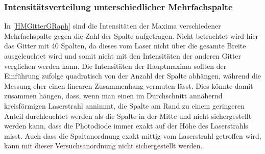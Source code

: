 \documentclass[
	a4paper,
	12pt,
	pagesize,
	ngerman
]{scrartcl}
\begin{document}
	\subsubsection{Intensitätsverteilung unterschiedlicher Mehrfachspalte}
	In \cref{HMGitterGRaph} sind die Intensitäten der Maxima verschiedener Mehrfachspalte gegen die Zahl der Spalte aufgetragen.
	Nicht betrachtet wird hier das Gitter mit 40 Spalten, da dieses vom Laser nicht über die gesamte Breite ausgeleuchtet wird und somit nicht mit den Intensitäten der anderen Gitter verglichen werden kann.
	Die Intensitäten der Hauptmaxima sollten der Einführung zufolge quadratisch von der Anzahl der Spalte abhängen, während die Messung eher einen linearen Zusammenhang vermuten lässt.
	Dies könnte damit zusammen hängen, dass, wenn man einen im Durchschnitt annähernd kreisförmigen Laserstrahl annimmt, die Spalte am Rand zu einem geringeren Anteil durchleuchtet werden als die Spalte in der Mitte und nicht sichergestellt werden kann, dass die Photodiode immer exakt auf der Höhe des Laserstrahls misst.
	Auch dass die Spaltanordnung exakt mittig vom Laserstrahl getroffen wird, kann mit dieser Versuchsanordnung nicht sichergestellt werden. %
	
\end{document}
